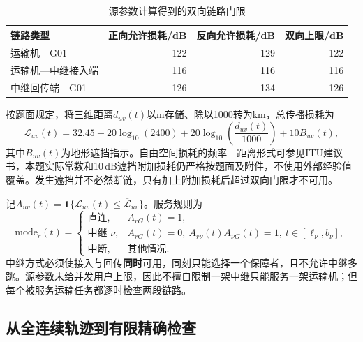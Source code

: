 \documentclass[a4paper]{my_paper}%
\numberwithin{equation}{section}
\newcommand{\ind}{\mathbf{1}}
\theoremstyle{definition}
\begin{document}
\begin{table}[htbp]\centering\small
\caption{源参数计算得到的双向链路门限}\label{tab:radio}
\begin{tabular}{@{}lrrr@{}}\toprule
链路类型 & 正向允许损耗/dB & 反向允许损耗/dB & 双向上限/dB\\\midrule
运输机—G01 &122&129&122\\
运输机—中继接入端 &116&116&116\\
中继回传端—G01 &126&134&126\\\bottomrule
\end{tabular}
\end{table}

按题面规定，将三维距离$d_{uv}(t)$以m存储、除以1000转为km，总传播损耗为
\begin{equation}
 \mathcal L_{uv}(t)=32.45+20\log_{10}(2400)
 +20\log_{10}\!\left(\frac{d_{uv}(t)}{1000}\right)+10B_{uv}(t),
 \label{eq:propagation}
\end{equation}
其中$B_{uv}(t)$为地形遮挡指示。自由空间损耗的频率—距离形式可参见ITU建议书\cite{itu}，本题实际常数和10\,dB遮挡附加损耗仍严格按题面及附件，不使用外部经验值覆盖。发生遮挡并不必然断链，只有加上附加损耗后超过双向门限才不可用。

记$A_{uv}(t)=\ind\{\mathcal L_{uv}(t)\le\overline{\mathcal L}_{uv}\}$。服务规则为
\begin{equation}
 \mathrm{mode}_r(t)=
 \begin{cases}
 \text{直连},&A_{rG}(t)=1,\\
 \text{中继 }\nu,&A_{rG}(t)=0,\ A_{r\nu}(t)A_{\nu G}(t)=1,\ t\in[\ell_\nu,b_\nu],\\
 \text{中断},&\text{其他情况}.
 \end{cases}
 \label{eq:service}
\end{equation}
中继方式必须使接入与回传\textbf{同时}可用，同刻只能选择一个保障者，且不允许中继多跳。源参数未给并发用户上限，因此不擅自限制一架中继只能服务一架运输机；但每个被服务运输任务都逐时检查两段链路。

\subsection{从全连续轨迹到有限精确检查}
\end{document}

